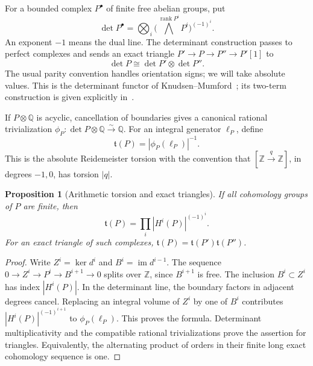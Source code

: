 \documentclass[11pt]{article}
\newtheorem{proposition}[theorem]{Proposition}
\theoremstyle{definition}
\theoremstyle{remark}
\newcommand{\Q}{\mathbb Q}
\newcommand{\Z}{\mathbb Z}
\begin{document}
For a bounded complex \(P^\bullet\) of finite free abelian groups, put
\[
 \det P^\bullet=
 \bigotimes_i\bigl(\textstyle\bigwedge^{\operatorname{rank}P^i}P^i
                   \bigr)^{(-1)^i}.
\]
An exponent \(-1\) means the dual line. The determinant construction
passes to perfect complexes and sends an exact triangle
\(P'\to P\to P''\to P'[1]\) to
\[
 \det P\cong\det P'\otimes\det P''.
\]
The usual parity convention handles orientation signs; we will take
absolute values. This is the determinant functor of
Knudsen--Mumford~\cite{derived-knudsen-mumford}; its two-term construction
is given explicitly in~\cite{derived-stacks-determinants}.

If \(P\otimes\Q\) is acyclic, cancellation of boundaries gives a
canonical rational trivialization
\(\phi_P:\det P\otimes\Q\xrightarrow{\sim}\Q\).
For an integral generator \(\ell_P\), define
\[
 \mathfrak t(P)=|\phi_P(\ell_P)|^{-1}.
\]
This is the absolute Reidemeister torsion with the convention that
\([\Z\xrightarrow{q}\Z]\), in degrees \(-1,0\), has torsion \(|q|\).

\begin{proposition}[Arithmetic torsion and exact triangles]
\label{prop:derived-arithmetic-torsion}
If all cohomology groups of \(P\) are finite, then
\begin{equation}\label{eq:derived-torsion-product}
 \mathfrak t(P)=\prod_i|H^i(P)|^{(-1)^i}.
\end{equation}
For an exact triangle of such complexes,
\(\mathfrak t(P)=\mathfrak t(P')\mathfrak t(P'')\).
\end{proposition}
\begin{proof}
Write \(Z^i=\ker d^i\) and \(B^i=\operatorname{im}d^{i-1}\).
The sequence \(0\to Z^i\to P^i\to B^{i+1}\to0\) splits over \(\Z\),
since \(B^{i+1}\) is free. The inclusion \(B^i\subset Z^i\) has index
\(|H^i(P)|\). In the determinant line, the boundary factors in adjacent
degrees cancel. Replacing an integral volume of \(Z^i\) by one of
\(B^i\) contributes \(|H^i(P)|^{(-1)^{i+1}}\) to
\(\phi_P(\ell_P)\). This proves the formula. Determinant multiplicativity
and the compatible rational trivializations prove the assertion for
triangles. Equivalently, the alternating product of orders in their
finite long exact cohomology sequence is one.
\end{proof}
\end{document}
